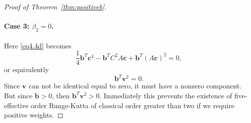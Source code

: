 \begin{proof}[Proof of Theorem~\ref{thm:positiveb}]
    \paragraph{Case 3: \( \beta_2 = 0 \).}
    Here \eqref{eq4.4d} becomes
    \begin{equation*}
        \frac{1}{4}\bm{b}^{T}\bm{c}^{4} - \bm{b}^{T}C^{2}A\bm{c} + \bm{b}^{T}(A\bm{c})^{2} = 0,
    \end{equation*}
    or equivalently
    \begin{equation*}
        \bm{b}^{T}\bm{v}^{2} = 0.
    \end{equation*}
    Since \( \bm{v} \) can not be identical equal to zero, it must have a nonzero component. But since \( \bm{b} > 0 \), then \( \bm{b}^{T}\bm{v}^{2} > 0 \). Immediately this prevents the existence of five-effective order Runge-Kutta of classical order greater than two if we require positive weights.
\end{proof}